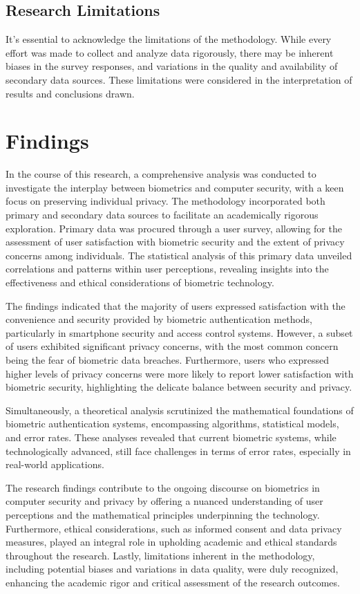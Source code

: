\documentclass{IEEEtran}
\begin{document}
\subsection{Research Limitations}
It's essential to acknowledge the limitations of the methodology. While every effort was made to collect and analyze data rigorously, there may be inherent biases in the survey responses, and variations in the quality and availability of secondary data sources. These limitations were considered in the interpretation of results and conclusions drawn.

\section{Findings}
In the course of this research, a comprehensive analysis was conducted to investigate the interplay between biometrics and computer security, with a keen focus on preserving individual privacy. The methodology incorporated both primary and secondary data sources to facilitate an academically rigorous exploration. Primary data was procured through a user survey, allowing for the assessment of user satisfaction with biometric security and the extent of privacy concerns among individuals. The statistical analysis of this primary data unveiled correlations and patterns within user perceptions, revealing insights into the effectiveness and ethical considerations of biometric technology.

The findings indicated that the majority of users expressed satisfaction with the convenience and security provided by biometric authentication methods, particularly in smartphone security and access control systems. However, a subset of users exhibited significant privacy concerns, with the most common concern being the fear of biometric data breaches. Furthermore, users who expressed higher levels of privacy concerns were more likely to report lower satisfaction with biometric security, highlighting the delicate balance between security and privacy.

Simultaneously, a theoretical analysis scrutinized the mathematical foundations of biometric authentication systems, encompassing algorithms, statistical models, and error rates. These analyses revealed that current biometric systems, while technologically advanced, still face challenges in terms of error rates, especially in real-world applications.

The research findings contribute to the ongoing discourse on biometrics in computer security and privacy by offering a nuanced understanding of user perceptions and the mathematical principles underpinning the technology. Furthermore, ethical considerations, such as informed consent and data privacy measures, played an integral role in upholding academic and ethical standards throughout the research. Lastly, limitations inherent in the methodology, including potential biases and variations in data quality, were duly recognized, enhancing the academic rigor and critical assessment of the research outcomes.
\end{document}
